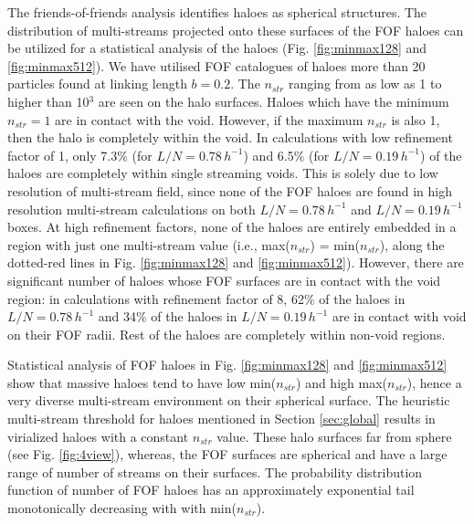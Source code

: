 The friends-of-friends analysis identifies haloes as spherical structures. The distribution of multi-streams projected onto these surfaces of the FOF haloes can be utilized for a statistical analysis of the haloes (Fig. \ref{fig:minmax128} and \ref{fig:minmax512}). We have utilised FOF catalogues of haloes more than 20 particles found at linking length $ b= 0.2$.  The $n_{str}$ ranging from as low as 1 to higher than 10$^3$ are seen on the halo surfaces. Haloes which have the minimum $n_{str} = 1$ are in contact with the void. However, if the maximum $n_{str}$ is also 1, then the halo is completely within the void. In calculations with low refinement factor of 1, only 7.3$\%$ (for  $L/N = 0.78 \,h^{-1}$) and 6.5$\%$ (for  $L/N = 0.19 \,h^{-1}$) of the haloes are completely within single streaming voids. This is solely due to low resolution of multi-stream field, since none of the FOF haloes are found in high resolution multi-stream calculations on both $L/N = 0.78 \,h^{-1}$ and $L/N = 0.19 \,h^{-1}$ boxes. At high refinement factors, none of the haloes are entirely embedded in a region with just one multi-stream value (i.e., max($n_{str}$) = min($n_{str}$), along the dotted-red lines in Fig. \ref{fig:minmax128} and \ref{fig:minmax512}). However, there are significant number of haloes whose FOF surfaces are in contact with the void region: in calculations with refinement factor of 8, 62$\%$ of the haloes in $L/N = 0.78 \,h^{-1}$ and 34$\%$ of the haloes in $L/N = 0.19 \,h^{-1}$ are in contact with void on their FOF radii. Rest of the haloes are completely within non-void regions.

Statistical analysis of FOF haloes in Fig. \ref{fig:minmax128} and \ref{fig:minmax512} show that massive haloes tend to have low min($n_{str}$) and high max($n_{str}$), hence a very diverse multi-stream environment on their spherical surface. The heuristic  multi-stream threshold for haloes mentioned in Section \ref{sec:global} results in virialized haloes with a constant $n_{str}$ value. These halo surfaces far from sphere (see Fig. \ref{fig:4view}), whereas, the FOF surfaces are spherical and have a large range of number of streams on their surfaces. The probability distribution function of number of FOF haloes has an approximately exponential tail monotonically decreasing with with min($n_{str}$). 


